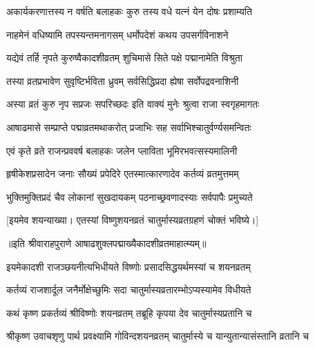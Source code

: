 \twolineshloka
{अकार्यकरणात्तस्य न वर्षति बलाहकः}
{कुरु तस्य वधे यत्नं येन दोषः प्रशाम्यति} %


\twolineshloka
{नाहमेनं वधिष्यामि तपस्यन्तमनागसम्}
{धर्मोपदेशं कथय उपसर्गविनाशने} %


\twolineshloka
{यद्येवं तर्हि नृपते कुरुष्वैकादशीव्रतम्}
{शुचिमासे सिते पक्षे पद्मानामेति विश्रुता} %

\twolineshloka
{तस्या व्रतप्रभावेण सुवृष्टिर्भविता ध्रुवम्}
{सर्वसिद्धिप्रदा ह्येषा सर्वोपद्रवनाशिनी} %

\twolineshloka
{अस्या व्रतं कुरु नृप सप्रजः सपरिच्छदः}
{इति वाक्यं मुनेः श्रुत्वा राजा स्वगृहमागतः} %

\twolineshloka
{आषाढमासे सम्प्राप्ते पद्माव्रतमथाकरोत्}
{प्रजाभिः सह सर्वाभिश्चातुर्वर्ण्यसमन्वितः} %

\twolineshloka
{एवं कृते व्रते राजन्प्रववर्ष बलाहकः}
{जलेन प्लाविता भूमिरभवत्सस्यमालिनी} %

\twolineshloka
{हृषीकेशप्रसादेन जनाः सौख्यं प्रपेदिरे}
{एतस्मात्कारणादेव कर्तव्यं व्रतमुत्तमम्} %

\twolineshloka
{भुक्तिमुक्तिप्रदं चैव लोकानां सुखदायकम्}
{पठनाच्छ्रवणादस्याः सर्वपापैः प्रमुच्यते} %

[इयमेव शयन्याख्या। एतस्यां विष्णुशयनव्रतं चातुर्मास्यव्रतग्रहणं चोक्तं भविष्ये।]

॥इति श्रीवाराहपुराणे आषाढशुक्लपद्माख्यैकादशीव्रतमाहात्म्यम्॥


\hyperref[sec:ekadashi_mahatmyam_vrata_raja]{\closesub}
\clearpage

\label{sec:vrata-raja-ashadha-shukla-shayani-bhavishya}


\twolineshloka
{इयमेकादशी राजञ्छयनीत्यभिधीयते}
{विष्णोः प्रसादसिद्धयर्थमस्यां च शयनव्रतम्} %

\twolineshloka
{कर्तव्यं राजशार्दूल जनैर्मोक्षेच्छुमिः सदा}
{चातुर्मास्यव्रतारम्भोऽप्यस्यामेव विधीयते} %


\twolineshloka
{कथं कृष्ण प्रकर्तव्यं श्रीविष्णोः शयनव्रतम्}
{तब्रूहि कृपया देव चातुर्मास्यप्रतानि च} %

\twolineshloka
{श्रीकृष्ण उवाचशृणु पार्थ प्रवक्ष्यामि गोविन्दशयनव्रतम्}
{चातुर्मास्ये च यान्युतान्यासंस्तानि व्रतानि च} %

